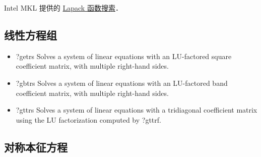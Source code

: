 
\begin{issues}
\issueDraft
\end{issues}


Intel MKL 提供的 \href{https://www.intel.com/content/www/us/en/developer/tools/oneapi/onemkl-function-finding-advisor.html}{Lapack 函数搜索}．

\subsection{线性方程组}
\begin{itemize}
\item ?getrs Solves a system of linear equations with an LU-factored square coefficient matrix, with multiple right-hand sides.
\item ?gbtrs Solves a system of linear equations with an LU-factored band coefficient matrix, with multiple right-hand sides.
\item ?gttrs Solves a system of linear equations with a tridiagonal coefficient matrix using the LU factorization computed by ?gttrf.
\end{itemize}


\subsection{对称本征方程}
